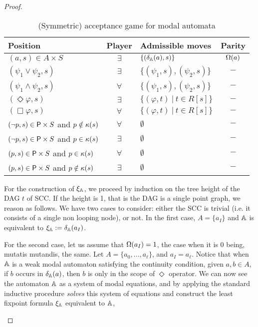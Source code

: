 \begin{proof}
\begin{pfclaim}
\begin{table}[h]
  \centering
\begin{tabular}{|l|c|l|c|}
 \hline
  Position & Player & Admissible moves & Parity\\
   \hline
  $(a,s) \in A \times S$ & $\exists$ & $\{(\delta_\mathbb{A}(a),s)\}$ & $\Omega(a)$\\
  $(\psi_1 \vee \psi_2,s)$ & $\exists$ & $\{(\psi_1,s),(\psi_2,s) \}$ & $-$ \\
  $(\psi_1 \wedge \psi_2,s)$ & $\forall$ & $\{(\psi_1,s),(\psi_2,s) \}$ & $-$ \\
  $(\Diamond\varphi,s)$ & $\exists$ & $\{(\varphi,t)\ |\ t \in R[s] \}$ & $-$ \\
  $(\Box\varphi,s)$ & $\forall$ & $\{(\varphi,t)\ |\ t \in R[s] \}$ & $-$ \\
  $(\lnot p,s) \in \mathsf{P} \times S$ and $p \notin \kappa(s)$ & $\forall$ & $\emptyset$ & $-$\\
  $(\lnot p,s) \in \mathsf{P} \times S$ and $p \in \kappa(s)$ & $\exists$ & $\emptyset$ & $-$\\
  $(p,s) \in \mathsf{P} \times S$ and $p \in \kappa(s)$ & $\forall$ & $\emptyset$ & $-$\\
  $(p,s) \in \mathsf{P} \times S$ and $p \notin \kappa(s)$ & $\exists$ & $\emptyset$ & $-$\\

  \hline
\end{tabular}
 \caption{(Symmetric) acceptance game for modal automata}
 \label{symmetric_modal_game}
\end{table}





For the construction of $\xi_\mathbb{A}$, we proceed by induction on the tree height of the DAG $t$ of SCC. If the height is 1, that is the DAG is a single point graph, we reason as follows.
 We have two cases to consider: either the SCC is trivial (i.e. it consists of a single non looping node), or not.
In the first case, $A=\{a_I\}$ and $\mathbb{A}$ is equivalent to $\xi_\mathbb{A}:=\delta_\mathbb{A}(a_I)$.

For the second case, let us assume that $\Omega(a_I)=1$, the case when it is $0$ being, mutatis mutandis, the same.
Let $A=\{a_0, \dots, a_\ell\}$, and $a_I=a_\ell$.
Notice that when $\mathbb{A}$ is a weak modal automaton satisfying the continuity condition, given $a,b \in A$, if $b$ occurs in $\delta_\mathbb{A}(a)$, then $b$ is only in the scope of $\Diamond$ operator. 
We can now see the automaton $\mathbb{A}$
as a system of modal equations, and by applying the standard inductive procedure \emph{solves} this system of equations and
construct the least fixpoint formula $\xi_\mathbb{A}$ equivalent to $\mathbb{A}$, 


\end{pfclaim}
\end{proof}
